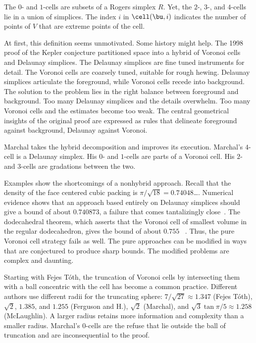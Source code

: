 The $0$- and $1$-cells are  subsets of a Rogers  simplex
$R$.  Yet, the $2$-, $3$-, and $4$-cells lie in a union of
simplices.  The index $i$ in  $\cell(\bu,i)$ indicates the number
of points of $V$ that are extreme points of the cell. 

At first, this definition seems unmotivated.  Some history might help.
The 1998 proof of the Kepler conjecture partitioned space into a
hybrid of Voronoi cells and Delaunay simplices.  The Delaunay
simplices are fine tuned instruments for detail.  The Voronoi cells
are coarsely tuned, suitable for rough hewing.  Delaunay simplices
articulate the foreground, while Voronoi cells recede into background.  The
solution to the problem lies in the right balance between foreground
and background.  Too many Delaunay simplices and the details
overwhelm.  Too many Voronoi cells and the estimates become too weak.
The central geometrical insights of the original proof are expressed as
rules that delineate foreground against background, Delaunay against
Voronoi.

Marchal takes the  hybrid decomposition and improves its
execution.  Marchal's $4$-cell is a Delaunay simplex.  His $0$- and
$1$-cells are parts of a Voronoi cell.  His $2$- and $3$-cells are
gradations between the two.

Examples show the shortcomings of a nonhybrid approach.
Recall that the density of the face centered cubic packing is
$\pi/\sqrt{18}=0.74048$\ldots.  Numerical evidence shows that an
approach based entirely on Delaunay simplices should give a bound of
about $0.740873$, a failure that comes tantalizingly
close~\cite{Hales:1992:JCAM}.  The dodecahedral theorem, which asserts that the
Voronoi cell of smallest volume in the regular dodecahedron, gives the
bound of about $0.755$ ~\cite{Hales:2010:Dodec}.  Thus, the pure Voronoi cell
strategy fails as well.  The pure approaches can be modified in ways
that are conjectured to produce sharp bounds. The modified problems
are complex and daunting.

Starting with Fejes T\'oth,  the truncation of Voronoi cells by intersecting them with a ball concentric
with the cell  has become a common practice.  Different authors use different radii for the
truncating sphere: $7/\sqrt{27}\approx 1.347$ (Fejes T\'oth), $\sqrt2$,
$1.385$, and $1.255$ (Ferguson and H.), $\sqrt2$ (Marchal), and
$\sqrt{3}\tan{\pi/5}\approx 1.258$ (McLaughlin).  A larger radius
retains more information and complexity than a smaller radius.
Marchal's $0$-cells are the refuse that lie outside the ball of truncation and
are inconsequential to the proof.



